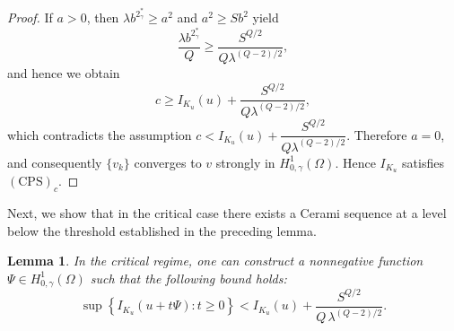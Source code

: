 \documentclass[11pt]{article}
\newtheorem{lemma}{Lemma}[section] %
\newcommand{\spacegr}{H^{1}_{0,\gamma}(\Omega)}
\begin{document}
\begin{proof}
If $a > 0$, then $\lambda b^{2_{\gamma}^*} \ge a^2$ and $a^2 \ge S b^2$ yield
\[
\frac{\lambda b^{2_{\gamma}^*}}{Q} \ge \frac{S^{Q/2}}{Q \lambda^{(Q-2)/2}},
\]
and hence we obtain
\[
c \ge I_{K_u}(u) + \frac{S^{Q/2}}{Q \lambda^{(Q-2)/2}},
\]
which contradicts the assumption $c < I_{K_u}(u) + \dfrac{S^{Q/2}}{Q \lambda^{(Q-2)/2}}$.
Therefore $a = 0$, and consequently $\{v_k\}$ converges to $v$ strongly in $\spacegr$.
Hence $I_{K_u}$ satisfies $(\mathrm{CPS})_c$. 
\end{proof}

Next, we show that in the critical case there exists a Cerami sequence at a level below the threshold established in the preceding lemma.
\begin{lemma}\label{lem:critical-case-psi}
In the critical regime, one can construct a nonnegative function $\Psi \in \spacegr$ such that the following bound holds:
\begin{equation*}
\sup\left\{ I_{K_u}(u + t\Psi) : t \ge 0 \right\}
<
I_{K_u}(u) + \frac{S^{Q/2}}{Q\,\lambda^{(Q-2)/2}}.
\end{equation*}
\end{lemma}
\end{document}
